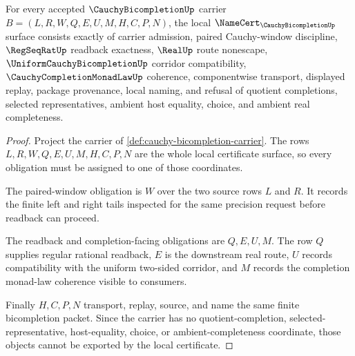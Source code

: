 \begin{theorem}
\label{thm:cauchy-bicompletion-namecert-obligations}
For every accepted $\CauchyBicompletionUp$ carrier $B=(L,R,W,Q,E,U,M,H,C,P,N)$, the local $\NameCert_{\CauchyBicompletionUp}$ surface consists exactly of carrier admission, paired Cauchy-window discipline, $\RegSeqRatUp$ readback exactness, $\RealUp$ route nonescape, $\UniformCauchyBicompletionUp$ corridor compatibility, $\CauchyCompletionMonadLawUp$ coherence, componentwise transport, displayed replay, package provenance, local naming, and refusal of quotient completions, selected representatives, ambient host equality, choice, and ambient real completeness.
\end{theorem}
\begin{proof}
Project the carrier of \autoref{def:cauchy-bicompletion-carrier}. The rows $L,R,W,Q,E,U,M,H,C,P,N$ are the whole local certificate surface, so every obligation must be assigned to one of those coordinates.

The paired-window obligation is $W$ over the two source rows $L$ and $R$. It records the finite left and right tails inspected for the same precision request before readback can proceed.

The readback and completion-facing obligations are $Q,E,U,M$. The row $Q$ supplies regular rational readback, $E$ is the downstream real route, $U$ records compatibility with the uniform two-sided corridor, and $M$ records the completion monad-law coherence visible to consumers.

Finally $H,C,P,N$ transport, replay, source, and name the same finite bicompletion packet. Since the carrier has no quotient-completion, selected-representative, host-equality, choice, or ambient-completeness coordinate, those objects cannot be exported by the local certificate.
\end{proof}

